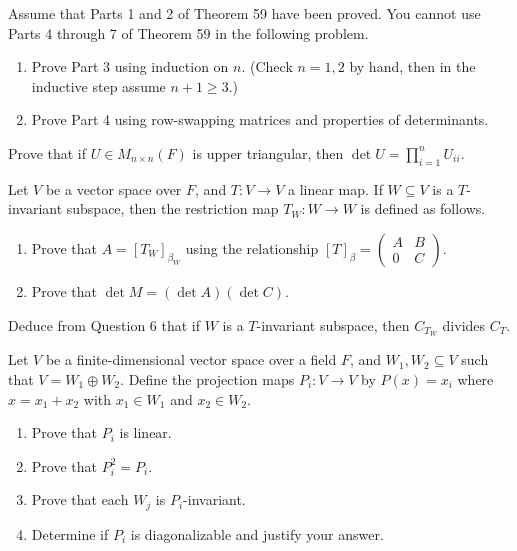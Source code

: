 \documentclass{eh-homework}
\begin{document}
    \begin{question}{4}
    Assume that Parts 1 and 2 of Theorem 59 have been proved. You cannot use Parts 4 through 7 of Theorem 59 in the following problem.
    
    \begin{enumerate}
        \item Prove Part 3 using induction on $n$. (Check $n = 1, 2$ by hand, then in the inductive step assume $n+1 \ge 3$.)
        \item Prove Part 4 using row-swapping matrices and properties of determinants.
    \end{enumerate}
    \end{question}
    
    \begin{question}{5}
    Prove that if $U \in M_{n \times n}(F)$ is upper triangular, then $\det U = \prod_{i=1}^n U_{ii}$.
    \end{question}
    
    \begin{question}{6}
    Let $V$ be a vector space over $F$, and $T : V \to V$ a linear map. If $W \subseteq V$ is a $T$-invariant subspace, then the restriction map $T_W : W \to W$ is defined as follows.
    
    \begin{enumerate}
        \item Prove that $A = [T_W]_{\beta_W}$ using the relationship $[T]_\beta = \begin{pmatrix} A & B \\ 0 & C \end{pmatrix}$.
        \item Prove that $\det M = (\det A)(\det C)$.
    \end{enumerate}
    \end{question}
    
    \begin{question}{7}
    Deduce from Question 6 that if $W$ is a $T$-invariant subspace, then $C_{T_W}$ divides $C_T$.
    \end{question}
    
    \begin{question}{8}
    Let $V$ be a finite-dimensional vector space over a field $F$, and $W_1, W_2 \subseteq V$ such that $V = W_1 \oplus W_2$. Define the projection maps $P_i : V \to V$ by $P(x) = x_i$ where $x = x_1 + x_2$ with $x_1 \in W_1$ and $x_2 \in W_2$.
    
    \begin{enumerate}
        \item Prove that $P_i$ is linear.
        \item Prove that $P_i^2 = P_i$.
        \item Prove that each $W_j$ is $P_i$-invariant.
        \item Determine if $P_i$ is diagonalizable and justify your answer.
    \end{enumerate}
    \end{question}
    
\end{document}
